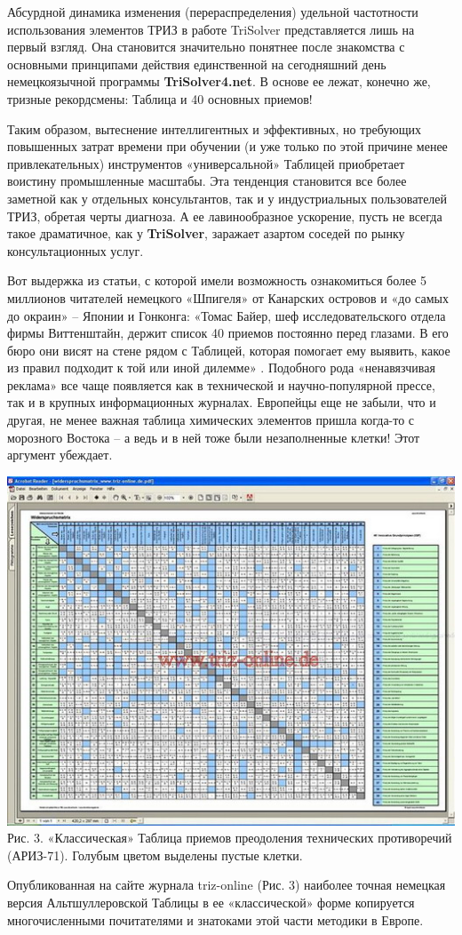 \documentclass[11pt,a4paper]{article}
\begin{document}
Абсурдной динамика изменения (перераспределения) удельной частотности
использования элементов ТРИЗ в работе TriSolver представляется лишь на первый
взгляд. Она становится значительно понятнее после знакомства с основными
принципами действия единственной на сегодняшний день немецкоязычной программы
\textbf{TriSolver4.net}. В основе ее лежат, конечно же, тризные рекордсмены:
Таблица и 40 основных приемов!

Таким образом, вытеснение интеллигентных и эффективных, но требующих
повышенных затрат времени при обучении (и уже только по этой причине менее
привлекательных) инструментов «универсальной» Таблицей приобретает воистину
промышленные масштабы. Эта тенденция становится все более заметной как у
отдельных консультантов, так и у индустриальных пользователей ТРИЗ, обретая
черты диагноза. А ее лавинообразное ускорение, пусть не всегда такое
драматичное, как у \textbf{TriSolver}, заражает азартом соседей по рынку
консультационных услуг.

Вот выдержка из статьи, с которой имели возможность ознакомиться более 5
миллионов читателей немецкого «Шпигеля» от Канарских островов и «до самых до
окраин» -- Японии и Гонконга: «Томас Байер, шеф исследовательского отдела
фирмы Виттенштайн, держит список 40 приемов постоянно перед глазами. В его
бюро они висят на стене рядом с Таблицей, которая помогает ему выявить, какое
из правил подходит к той или иной дилемме» \cite{Dworschak2005}. Подобного
рода «ненавязчивая реклама» все чаще появляется как в технической и
научно-популярной прессе, так и в крупных информационных журналах. Европейцы
еще не забыли, что и другая, не менее важная таблица химических элементов
пришла когда-то с морозного Востока -- а ведь и в ней тоже были незаполненные
клетки! Этот аргумент убеждает.

\begin{center}
  \includegraphics[width=.8\textwidth]{./4.jpg} \\
  Рис. 3. «Классическая» Таблица приемов преодоления технических противоречий
  (АРИЗ-71). Голубым цветом выделены пустые клетки.
\end{center}
Опубликованная на сайте журнала triz-online (Рис. 3) наиболее точная немецкая
версия Альтшуллеровской Таблицы в ее «классической» форме копируется
многочисленными почитателями и знатоками этой части методики в Европе.
\end{document}
